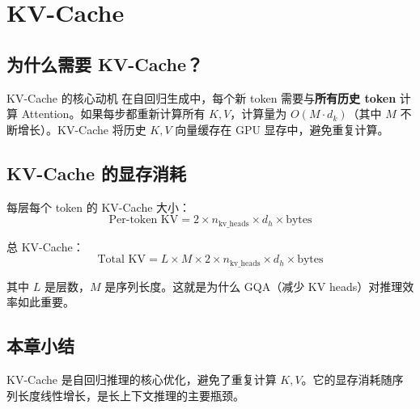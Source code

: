 \section{KV-Cache}

\subsection{为什么需要 KV-Cache？}

\begin{importantbox}{KV-Cache 的核心动机}
在自回归生成中，每个新 token 需要与\textbf{所有历史 token} 计算 Attention。如果每步都重新计算所有 $K, V$，计算量为 $O(M \cdot d_k)$（其中 $M$ 不断增长）。KV-Cache 将历史 $K, V$ 向量缓存在 GPU 显存中，避免重复计算。
\end{importantbox}

\subsection{KV-Cache 的显存消耗}

每层每个 token 的 KV-Cache 大小：
$$
\text{Per-token KV} = 2 \times n_{\text{kv\_heads}} \times d_h \times \text{bytes}
$$

总 KV-Cache：
$$
\text{Total KV} = L \times M \times 2 \times n_{\text{kv\_heads}} \times d_h \times \text{bytes}
$$

其中 $L$ 是层数，$M$ 是序列长度。这就是为什么 GQA（减少 KV heads）对推理效率如此重要。

\subsection{本章小结}

KV-Cache 是自回归推理的核心优化，避免了重复计算 $K, V$。它的显存消耗随序列长度线性增长，是长上下文推理的主要瓶颈。

